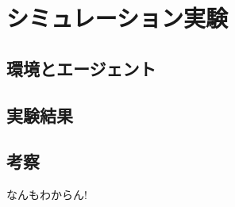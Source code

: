 \documentclass[../main]{subfiles}
\begin{document}
\newpage
\chapter{シミュレーション実験}
\label{chap:simulation}

\section{環境とエージェント}

\section{実験結果}
\section{考察}
なんもわからん!
\end{document}
